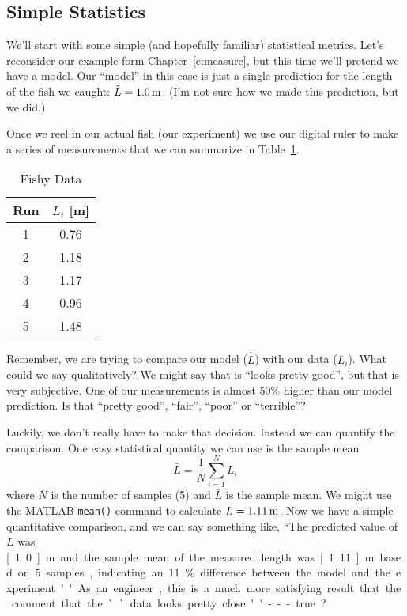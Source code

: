 \subsection{Simple Statistics}
We'll start with some simple (and hopefully familiar) statistical metrics.  Let's reconsider our example form Chapter~\ref{c:measure}, but this time we'll pretend we have a model.  Our ``model'' in this case is just a single prediction for the length of the fish we caught: $\hat{L}=\unit[1.0]{m}$.  (I'm not sure how we made this prediction, but we did.)  

Once we reel in our actual fish (our experiment) we use our digital ruler to make a series of measurements that we can summarize in Table~\ref{t:fishdata}. 
\begin{table}[bt!] 
\renewcommand{\arraystretch}{1.2}
\caption{Fishy Data}
\label{t:fishdata}
\centering
\begin{tabular}{|c|c|}\hline
Run & $L_i$ [m] \\ \hline \hline
1 & 0.76 \\ \hline
2 & 1.18 \\ \hline
3 & 1.17 \\ \hline
4 & 0.96 \\ \hline
5 & 1.48 \\ \hline
\end{tabular}
\end{table}
Remember, we are trying to compare our model ($\hat{L}$) with our data ($L_i$).  What could we say qualitatively?  We might say that is ``looks pretty good'', but that is very subjective.  One of our measurements is almost 50\% higher than our model prediction.  Is that ``pretty good'', ``fair'', ``poor'' or ``terrible''?

Luckily, we don't really have to make that decision.  Instead we can quantify the comparison.  One easy statistical quantity we can use is the \gls{sample mean}
\begin{equation}\label{e:mean}
\bar{L} = \frac{1}{N}\sum_{i=1}^{N} L_i
\end{equation}
where $N$ is the number of samples (5) and $\bar{L}$ is the sample mean.  We might use the MATLAB \texttt{mean()} command to calculate $\bar{L}=\unit[1.11]{m}$.  Now we have a simple quantitative comparison, and we can say something like, ``The predicted value of $L$ was \unit[1.0]{m} and the sample mean of the measured length was \unit[1.11]{m} based on 5 samples, indicating an 11\% difference between the model and the experiment.''  As an engineer, this is a much more satisfying result that the comment that the ``data looks pretty close''---true?

